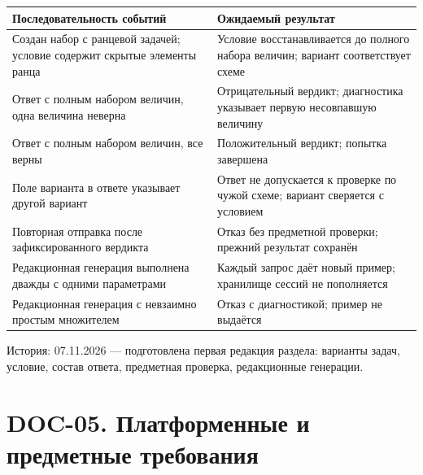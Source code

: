 \documentclass[12pt,a4paper]{article}
\newcounter{none} %
\begin{document}
{\def\LTcaptype{none} %
\begin{longtable}[]{@{}
  >{\raggedright\arraybackslash}p{}
  >{\raggedright\arraybackslash}p{}@{}}
\toprule\noalign{}
\begin{minipage}[b]{\linewidth}\raggedright
Последовательность событий
\end{minipage} & \begin{minipage}[b]{\linewidth}\raggedright
Ожидаемый результат
\end{minipage} \\
\midrule\noalign{}
\endhead
\bottomrule\noalign{}
\endlastfoot
Создан набор с ранцевой задачей; условие содержит скрытые элементы ранца & Условие восстанавливается до полного набора величин; вариант соответствует схеме \\
Ответ с полным набором величин, одна величина неверна & Отрицательный вердикт; диагностика указывает первую несовпавшую величину \\
Ответ с полным набором величин, все верны & Положительный вердикт; попытка завершена \\
Поле варианта в ответе указывает другой вариант & Ответ не допускается к проверке по чужой схеме; вариант сверяется с условием \\
Повторная отправка после зафиксированного вердикта & Отказ без предметной проверки; прежний результат сохранён \\
Редакционная генерация выполнена дважды с одними параметрами & Каждый запрос даёт новый пример; хранилище сессий не пополняется \\
Редакционная генерация с невзаимно простым множителем & Отказ с диагностикой; пример не выдаётся \\
\end{longtable}
}

История: 07.11.2026 --- подготовлена первая редакция раздела: варианты задач, условие, состав ответа, предметная проверка, редакционные генерации.

\section{DOC-05. Платформенные и предметные требования}\label{doc-05-ux43fux43bux430ux442ux444ux43eux440ux43cux435ux43dux43dux44bux435-ux438-ux43fux440ux435ux434ux43cux435ux442ux43dux44bux435-ux442ux440ux435ux431ux43eux432ux430ux43dux438ux44f}

\hypertarget{doc-05-платформенные-и-предметные-требования}{}
\end{document}
